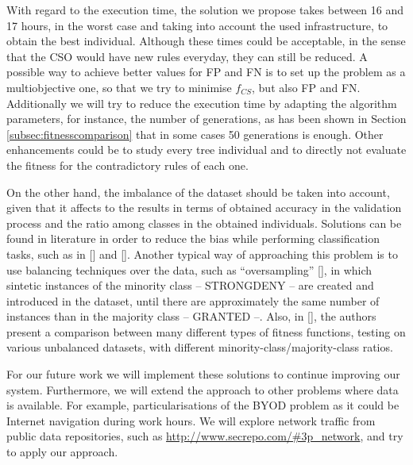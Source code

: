 With regard to the execution time, the solution we propose takes between 16 and 17 hours, in the worst case and taking into account the used infrastructure, to obtain the best individual. Although these times could be acceptable, in the sense that the CSO would have new rules everyday, they can still be reduced.  
A possible way to
achieve better values for FP and FN is to set up the problem as a
multiobjective one, so that we try to minimise $f_{CS}$, but also FP
and FN. Additionally we will try to reduce the execution time by adapting the algorithm parameters, for instance, the number of generations, as has been shown in Section \ref{subsec:fitnesscomparison} that in some cases 50 generations is enough. Other enhancements could be to study every tree individual and to directly not evaluate the fitness for the contradictory rules of each one. 

On the other hand, the imbalance of the dataset should be taken into
account, given that it affects to the results in terms of obtained
accuracy in the validation process and the ratio among classes in the
obtained individuals. Solutions can be found in literature in order to reduce the bias while performing classification
tasks, such as in [\cite{chawla2005data}] and [\cite{sun2009classification}]. Another typical way of approaching this problem is to
use balancing techniques over the data, such as ``oversampling'' [\cite{smote_02}], in
which sintetic instances of the minority class -- STRONGDENY -- are
created and introduced in the dataset, until there are approximately
the same number of instances than in the majority class -- GRANTED
--. Also, in [\cite{bhowan2012developing}], the authors present a comparison between many different types of
fitness functions, testing on various unbalanced datasets, with
different minority-class/majority-class ratios.

For our future work we will implement these solutions to continue
improving our system. Furthermore, we will extend the approach to other problems where data is available. For example, particularisations of the BYOD problem as it could be Internet navigation during work hours. We will explore network traffic from public data repositories, such as \url{http://www.secrepo.com/#3p\_network}, and try to apply our approach. 

